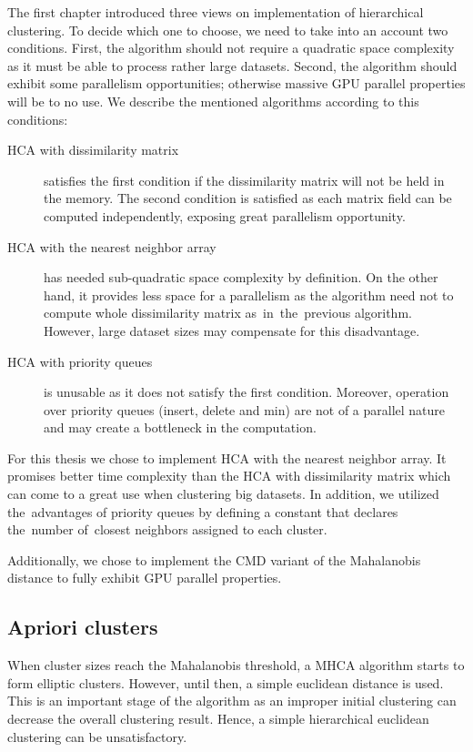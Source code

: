 The first chapter introduced three views on implementation of hierarchical clustering. To decide which one to choose, we need to take into an account two conditions. First, the algorithm should not require a quadratic space complexity as it must be able to process rather large datasets. Second, the algorithm should exhibit some parallelism opportunities; otherwise massive GPU parallel properties will be to no use.  We describe the mentioned algorithms according to this conditions:
\begin{description}

\item[HCA with dissimilarity matrix] satisfies the first condition if the dissimilarity matrix will not be held in the memory. The second condition is satisfied as each matrix field can be computed independently, exposing great parallelism opportunity. 

\item[HCA with the nearest neighbor array] has needed sub-quadratic space complexity by definition. On the other hand, it provides less space for a parallelism as the algorithm need not to compute whole dissimilarity matrix as~in~the~previous algorithm. However, large dataset sizes may compensate for this disadvantage. 

\item[HCA with priority queues] is unusable as it does not satisfy the first condition. Moreover, operation over priority queues (insert, delete and min) are not of a parallel nature and may create a bottleneck in the computation.

\end{description}

For this thesis we chose to implement HCA with the nearest neighbor array. It promises better time complexity than the HCA with dissimilarity matrix which can come to a great use when clustering big datasets. In addition, we utilized the~advantages of priority queues by defining a constant that declares the~number of~closest neighbors assigned to each cluster.

Additionally, we chose to implement the CMD variant of the Mahalanobis distance to fully exhibit GPU parallel properties.

\subsection{Apriori clusters}

When cluster sizes reach the Mahalanobis threshold, a MHCA algorithm starts to form elliptic clusters. However, until then, a simple euclidean distance is used. This is an important stage of the algorithm as an improper initial clustering can decrease the overall clustering result. Hence, a simple hierarchical euclidean clustering can be unsatisfactory.

